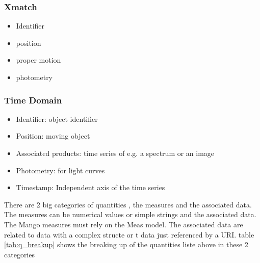 \documentclass[11pt,a4paper]{ivoa}
\begin{document}
\subsubsection{X\-match}
\begin{itemize}
    \item Identifier
    \item position
    \item proper motion
    \item photometry
\end{itemize}

\subsubsection{Time Domain}
\begin{itemize}
    \item Identifier: object identifier
    \item Position: moving object
    \item Associated products: time series of e.g. a spectrum or an image
    \item Photometry: for light curves
    \item Timestamp: Independent axis of the time series
\end{itemize}

There are 2 big categories of quantities , the measures and the associated data. The measures
 can be numerical values or simple strings and the associated data. The Mango measures must rely on the Meas model. The associated data are related to data with a complex structe or t data just referenced by a URI. table  \ref{tab:q_breakup} shows the breaking up of the quantities liste above in these 2 categories
\end{document}
